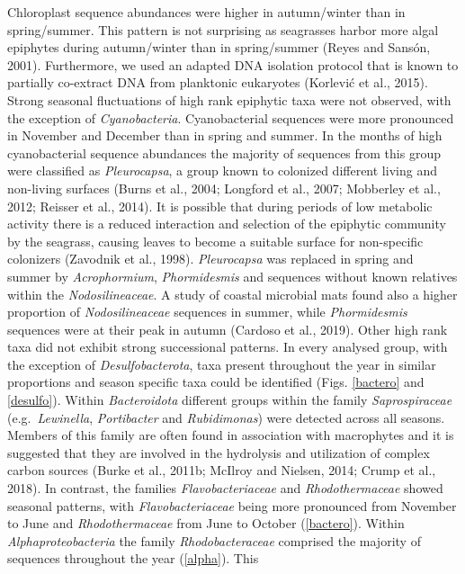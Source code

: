\documentclass[
  12pt,
]{article}
\begin{document}
Chloroplast sequence abundances were higher in autumn/winter than in
spring/summer. This pattern is not surprising as seagrasses harbor more
algal epiphytes during autumn/winter than in spring/summer (Reyes and
Sansón, 2001). Furthermore, we used an adapted DNA isolation protocol
that is known to partially co-extract DNA from planktonic eukaryotes
(Korlević et al., 2015). Strong seasonal fluctuations of high rank
epiphytic taxa were not observed, with the exception of
\emph{Cyanobacteria}. Cyanobacterial sequences were more pronounced in
November and December than in spring and summer. In the months of high
cyanobacterial sequence abundances the majority of sequences from this
group were classified as \emph{Pleurocapsa}, a group known to colonized
different living and non-living surfaces (Burns et al., 2004; Longford
et al., 2007; Mobberley et al., 2012; Reisser et al., 2014). It is
possible that during periods of low metabolic activity there is a
reduced interaction and selection of the epiphytic community by the
seagrass, causing leaves to become a suitable surface for non-specific
colonizers (Zavodnik et al., 1998). \emph{Pleurocapsa} was replaced in
spring and summer by \emph{Acrophormium}, \emph{Phormidesmis} and
sequences without known relatives within the \emph{Nodosilineaceae}. A
study of coastal microbial mats found also a higher proportion of
\emph{Nodosilineaceae} sequences in summer, while \emph{Phormidesmis}
sequences were at their peak in autumn (Cardoso et al., 2019). Other
high rank taxa did not exhibit strong successional patterns. In every
analysed group, with the exception of \emph{Desulfobacterota}, taxa
present throughout the year in similar proportions and season specific
taxa could be identified (Figs. \ref{bactero} and \ref{desulfo}). Within
\emph{Bacteroidota} different groups within the family
\emph{Saprospiraceae} (e.g.~\emph{Lewinella}, \emph{Portibacter} and
\emph{Rubidimonas}) were detected across all seasons. Members of this
family are often found in association with macrophytes and it is
suggested that they are involved in the hydrolysis and utilization of
complex carbon sources (Burke et al., 2011b; McIlroy and Nielsen, 2014;
Crump et al., 2018). In contrast, the families \emph{Flavobacteriaceae}
and \emph{Rhodothermaceae} showed seasonal patterns, with
\emph{Flavobacteriaceae} being more pronounced from November to June and
\emph{Rhodothermaceae} from June to October (\autoref{bactero}). Within
\emph{Alphaproteobacteria} the family \emph{Rhodobacteraceae} comprised
the majority of sequences throughout the year (\autoref{alpha}). This
\end{document}
